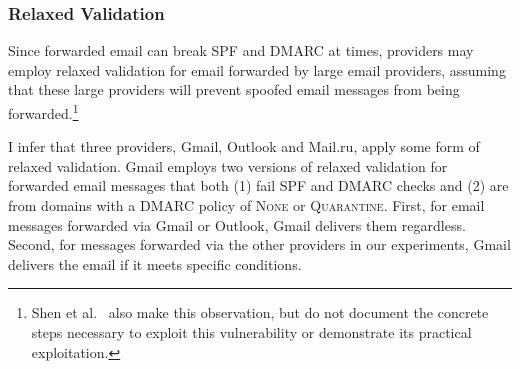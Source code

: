 \subsubsection{Relaxed Validation}
\label{subsubsec:relaxed_validation}
Since forwarded email can break SPF and DMARC at times, providers may employ relaxed validation for email forwarded by large email providers, assuming that these large providers will
prevent spoofed email messages from being forwarded.\footnote{Shen et al.~\cite{shen2020weak} also make this observation, but do not document the concrete steps necessary to exploit this vulnerability or demonstrate its practical exploitation.}


I infer that three providers, Gmail, Outlook and Mail.ru, apply some form of relaxed validation. Gmail employs two versions of relaxed validation for forwarded email messages that both (1) fail SPF and DMARC checks and (2) are from domains with a DMARC policy of \textsc{None} or \textsc{Quarantine}.
First, for email messages forwarded via Gmail or Outlook, Gmail delivers them regardless.
Second, for messages forwarded via
the other providers in our experiments,
Gmail delivers the email if it meets specific conditions.

